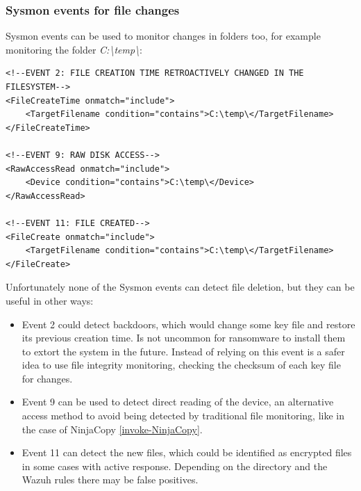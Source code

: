 \subsubsection{Sysmon events for file changes} \label{sysmon_events_file}
Sysmon events can be used to monitor changes in folders too, for example monitoring the folder \textit{C:{\textbackslash}temp{\textbackslash}}:
\begin{lstlisting}[style=xml]
<!--EVENT 2: FILE CREATION TIME RETROACTIVELY CHANGED IN THE FILESYSTEM-->
<FileCreateTime onmatch="include">
	<TargetFilename condition="contains">C:\temp\</TargetFilename>
</FileCreateTime>

<!--EVENT 9: RAW DISK ACCESS-->
<RawAccessRead onmatch="include">
	<Device condition="contains">C:\temp\</Device>
</RawAccessRead>

<!--EVENT 11: FILE CREATED-->
<FileCreate onmatch="include">
	<TargetFilename condition="contains">C:\temp\</TargetFilename>
</FileCreate>
\end{lstlisting}
\linej
Unfortunately none of the Sysmon events can detect file deletion, but they can be useful in other ways:
\begin{itemize}
	\item Event 2 could detect backdoors, which would change some key file and restore its previous creation time. Is not uncommon for ransomware to install them to extort the system in the future. Instead of relying on this event is a safer idea to use file integrity monitoring, checking the checksum of each key file for changes.
	\item Event 9 can be used to detect direct reading of the device, an alternative access method to avoid being detected by traditional file monitoring, like in the case of NinjaCopy \ref{invoke-NinjaCopy}.
	\item Event 11 can detect the new files, which could be identified as encrypted files in some cases with active response. Depending on the directory and the Wazuh rules there may be false positives.
\end{itemize}


